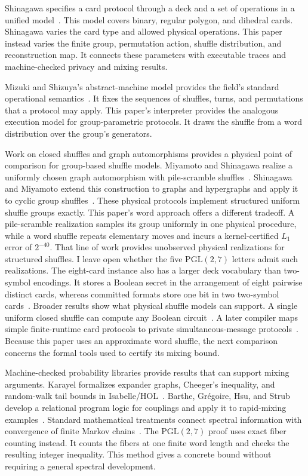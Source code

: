 \documentclass[runningheads]{llncs}
\newcommand{\PG}{\mathrm{PGL}(2,7)}
\begin{document}
Shinagawa specifies a card protocol through a deck and a set of operations in
a unified model~\cite{Shinagawa2021}. This model covers binary, regular
polygon, and dihedral cards. Shinagawa varies the card type and allowed
physical operations. This paper instead varies the finite group, permutation
action, shuffle distribution, and reconstruction map. It connects these
parameters with executable traces and machine-checked privacy and mixing
results.

Mizuki and Shizuya's abstract-machine model provides the field's standard
operational semantics~\cite{MizukiShizuya2014}. It fixes the sequences of
shuffles, turns, and permutations that a protocol may apply. This paper's
interpreter provides the analogous execution model for group-parametric
protocols. It draws the shuffle from a word distribution over the group's
generators.

Work on closed shuffles and graph automorphisms provides a physical point of
comparison for group-based shuffle models. Miyamoto and Shinagawa realize a
uniformly chosen graph automorphism with pile-scramble
shuffles~\cite{MiyamotoShinagawa2022}. Shinagawa and Miyamoto extend this
construction to graphs and hypergraphs and apply it to cyclic group
shuffles~\cite{ShinagawaMiyamoto2023}. These physical protocols implement
structured uniform shuffle groups exactly. This paper's word approach offers a
different tradeoff. A pile-scramble realization samples its group uniformly in
one physical procedure, while a word shuffle repeats elementary moves and
incurs a kernel-certified $L_1$ error of $2^{-40}$. That line of work provides
unobserved physical realizations for structured shuffles. I leave open whether
the five $\PG$ letters admit such realizations. The eight-card instance also
has a larger deck vocabulary than two-symbol encodings. It stores a Boolean
secret in the arrangement of eight pairwise distinct cards, whereas committed
formats store one bit in two two-symbol cards~\cite{MizukiSone2009}. Broader
results show what physical shuffle models can support. A single uniform closed
shuffle can compute any Boolean circuit~\cite{ShinagawaNuida2021}. A later
compiler maps simple finite-runtime card protocols to private
simultaneous-message protocols~\cite{ShinagawaNuida2025}. Because this paper
uses an approximate word shuffle, the next comparison concerns the formal
tools used to certify its mixing bound.

Machine-checked probability libraries provide results that can support mixing
arguments. Karayel formalizes expander graphs, Cheeger's inequality, and
random-walk tail bounds in Isabelle/HOL~\cite{Karayel2023}. Barthe,
Gr\'egoire, Hsu, and Strub develop a relational program logic for couplings
and apply it to rapid-mixing examples~\cite{BartheEtAl2017}. Standard
mathematical treatments connect spectral information with convergence of
finite Markov chains~\cite{LevinPeresWilmer2009}. The $\PG$ proof uses exact
fiber counting instead. It counts the fibers at one finite word length and
checks the resulting integer inequality. This method gives a concrete bound
without requiring a general spectral development.
\end{document}
